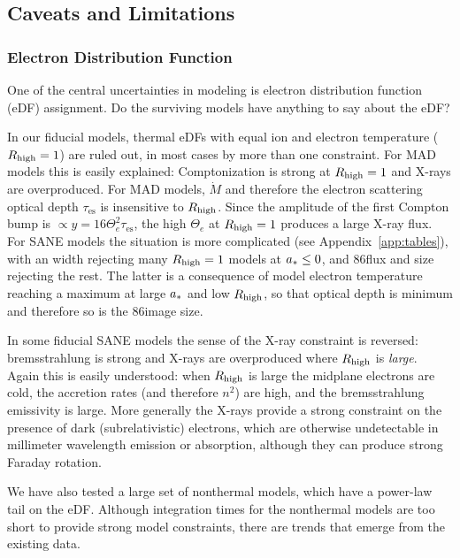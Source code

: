 \subsection{Caveats and Limitations}\label{sec:limits}

\subsubsection{Electron Distribution Function}

One of the central uncertainties in modeling \sgra is electron distribution function (eDF) assignment.
Do the surviving models have anything to say about the eDF?

In our fiducial models, thermal eDFs with equal ion and electron temperature ($R_\mathrm{high} = 1$) are ruled out, in most cases by more than one constraint.
For MAD models this is easily explained: Comptonization is strong at $R_\mathrm{high} = 1$ and X-rays are overproduced.
For MAD models, $\dot{M}$ and therefore the electron scattering optical depth $\tau_\mathrm{es}$ is insensitive to $R_\mathrm{high}$.
Since the amplitude of the first Compton bump is $\propto y = 16 \Theta_e^2 \tau_\mathrm{es}$, the high $\Theta_e$ at $R_\mathrm{high} = 1$ produces a large X-ray flux.
For SANE models the situation is more complicated (see Appendix~\ref{app:tables}), with an \mring width rejecting many $R_\mathrm{high} = 1$ models at $a_* \le 0$, and 86\GHz flux and size rejecting the rest.
The latter is a consequence of model electron temperature reaching a maximum at large $a_*$ and low $R_\mathrm{high}$, so that optical depth is minimum and therefore so is the 86\GHz image size.

In some fiducial SANE models the sense of the X-ray constraint is reversed: bremsstrahlung is strong and X-rays are overproduced where $R_\mathrm{high}$ is {\em large}.
Again this is easily understood: when $R_\mathrm{high}$ is large the midplane electrons are cold, the accretion rates (and therefore $n^2$) are high, and the bremsstrahlung emissivity is large.
More generally the X-rays provide a strong constraint on the presence of dark (subrelativistic) electrons, which are otherwise undetectable in millimeter wavelength emission or absorption, although they can produce strong Faraday rotation.

We have also tested a large set of nonthermal models, which have a power-law tail on the eDF.
Although integration times for the nonthermal models are too short to provide strong model constraints, there are trends that emerge from the existing data.

